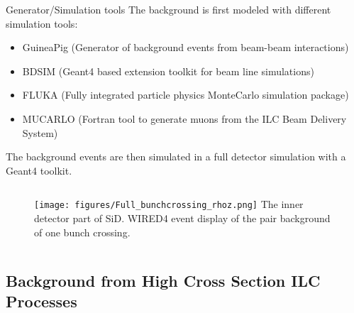 \documentclass[xcolor={dvipsnames}]{beamer}
\begin{document}
\begin{frame}{Generator/Simulation tools}
The background is first modeled with different simulation tools:\\
\begin{itemize}
\item \alert{GuineaPig} (Generator of background events from beam-beam interactions)
\item \alert{BDSIM} (Geant4 based extension toolkit for beam line simulations)
\item \alert{FLUKA} (Fully integrated particle physics MonteCarlo simulation package)
\item \alert{MUCARLO} (Fortran tool to generate muons from the ILC Beam Delivery System)
\end{itemize}
The background events are then simulated in a \alert{full detector simulation} with a Geant4 toolkit.
\begin{figure}
	\begin{columns}
         \flushright
        \texttt{[image: figures/Full\_bunchcrossing\_rhoz.png]}
        {\small The inner detector part of SiD. WIRED4 event display of the pair background of one bunch crossing.}
      \end{columns}
\end{figure}
	
\end{frame}

\subsection{Background from High Cross Section ILC Processes}
\end{document}
